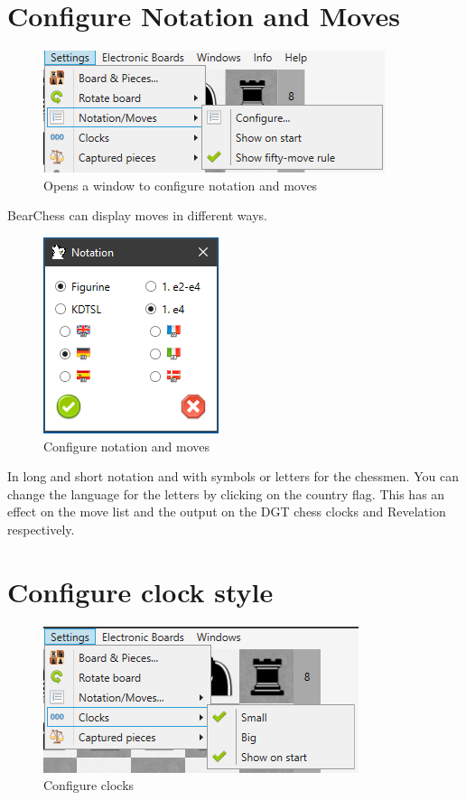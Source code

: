 \documentclass[11pt,a4paper]{article}
\begin{document}
\section{Configure Notation and Moves}
\begin{figure}[H]
	\centering
	\includegraphics[scale=0.9]{NotationAndMoves1.png}
	\caption{Opens a window to configure notation and moves }
	\label{fig:NotationAndMoves}
\end{figure}
BearChess can display moves in different ways.
\begin{figure}[H]
	\centering
	\includegraphics[scale=1.0]{NotationAndMoves2.png}
	\caption{Configure notation and moves }
	\label{fig:NotationAndMoves2}
\end{figure}
In long and short notation and with symbols or letters for the chessmen.
You can change the language for the letters by clicking on the country flag.
This has an effect on the move list and the output on the DGT chess clocks and Revelation respectively.

\section{Configure clock style}
\begin{figure}[H]
	\centering
	\includegraphics[scale=1.0]{ConfigureClocks.png}
	\caption{Configure clocks }
	\label{fig:ConfigureClocks}
\end{figure}
\end{document}
